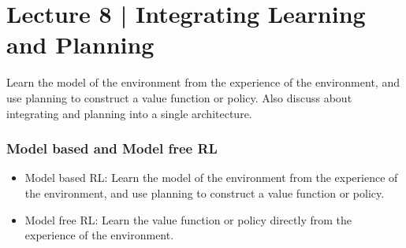 \section{Lecture 8 | Integrating Learning and Planning}
Learn the model of the environment from the experience of the environment, and use planning to construct
a value function or policy. Also discuss about integrating and planning into a single architecture.

\subsubsection*{Model based and Model free RL}
\begin{itemize}
    \item Model based RL: Learn the model of the environment from the experience of the environment, and use planning to construct
    a value function or policy.
    \item Model free RL: Learn the value function or policy directly from the experience of the environment.
\end{itemize}

